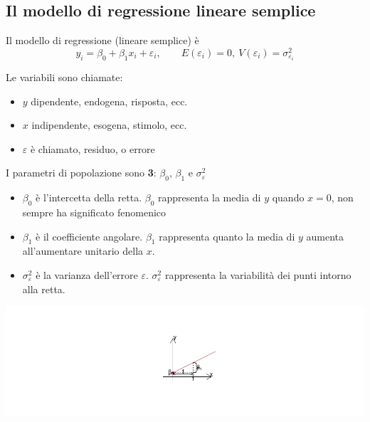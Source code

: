 \documentclass[
  11pt,
]{book}
\providecommand{\tightlist}{%
  \setlength{\itemsep}{0pt}\setlength{\parskip}{0pt}}
\theoremstyle{mytheoremstyle}
\theoremstyle{mydefstyle}
\newenvironment{nota}
  {
\begin{tcolorbox}[enhanced,breakable,arc=0.1mm,boxrule=1pt,colback=white,colframe=iblue,title=\bf \fontfamily{lmss}\selectfont \faInfoCircle \hspace{.5 cm} Nota,drop fuzzy shadow]
}{
\end{tcolorbox}
  }
\begin{document}
\subsection{Il modello di regressione lineare semplice}\label{il-modello-di-regressione-lineare-semplice}

Il modello di regressione (lineare semplice) è
\[y_i=\beta_0+\beta_1x_i+\varepsilon_i,\qquad E(\varepsilon_i)=0,~V(\varepsilon_i)=\sigma^2_{\varepsilon_i}\]

\begin{nota}

Le variabili sono chiamate:

\begin{itemize}
\tightlist
\item
  \(y\) dipendente, endogena, risposta, ecc.
\item
  \(x\) indipendente, esogena, stimolo, ecc.
\item
  \(\varepsilon\) è chiamato, residuo, o errore
\end{itemize}

I parametri di popolazione sono \textbf{3}: \(\beta_0\), \(\beta_1\) e \(\sigma^2_\varepsilon\)

\begin{itemize}
\tightlist
\item
  \(\beta_0\) è l'intercetta della retta. \(\beta_0\) rappresenta la media di \(y\) quando \(x=0\), non sempre ha significato fenomenico
\item
  \(\beta_1\) è il coefficiente angolare. \(\beta_1\) rappresenta quanto la media di \(y\) aumenta all'aumentare unitario della \(x\).
\item
  \(\sigma^2_\varepsilon\) è la varianza dell'errore \(\varepsilon\). \(\sigma^2_\varepsilon\) rappresenta la variabilità dei punti intorno alla retta.
\end{itemize}

\begin{center}\includegraphics{Appunti_di_Statistica_2025_files/figure-latex/17-regressione-I-17-1} \end{center}

\end{nota}
\end{document}
